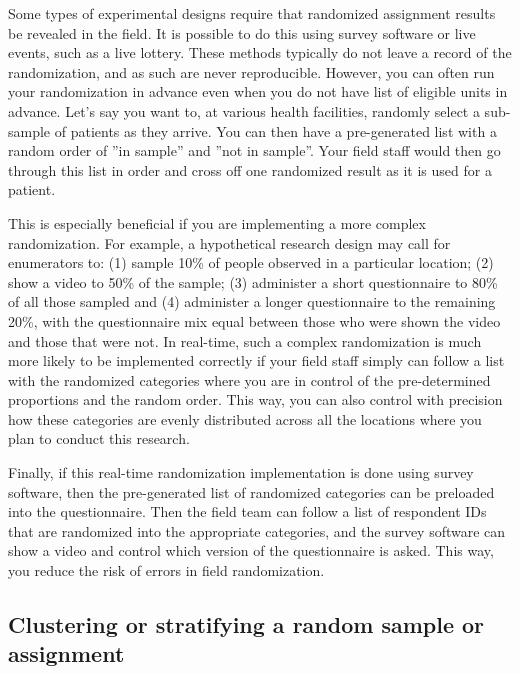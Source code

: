 
Some types of experimental designs require
that randomized assignment results be revealed in the field.
It is possible to do this using survey software or live events, such as a live lottery.
These methods typically do not leave a record of the randomization,
and as such are never reproducible.
However, you can often run your randomization in advance
even when you do not have list of eligible units in advance.
Let's say you want to, at various health facilities,
randomly select a sub-sample of patients as they arrive.
You can then have a pre-generated list
with a random order of ''in sample'' and ''not in sample''.
Your field staff would then go through this list in order
and cross off one randomized result as it is used for a patient.

This is especially beneficial if you are implementing a more complex randomization.
For example, a hypothetical research design may call for enumerators to:
(1) sample 10\% of people observed in a particular location;
(2) show a video to 50\% of the sample;
(3) administer a short questionnaire to 80\% of all those sampled
and (4) administer a longer questionnaire to the remaining 20\%,
with the questionnaire mix equal between those who were shown the video and those that were not.
In real-time, such a complex randomization is much more likely to be implemented correctly
if your field staff simply can follow a list with the randomized categories
where you are in control of the pre-determined proportions and the random order.
This way, you can also control with precision
how these categories are evenly distributed across all the locations
where you plan to conduct this research.

Finally, if this real-time randomization implementation is done using survey software,
then the pre-generated list of randomized categories can be preloaded
into the questionnaire.
Then the field team can follow a list of respondent IDs
that are randomized into the appropriate categories,
and the survey software can show a video and control which version of the questionnaire is asked.
This way, you reduce the risk of errors in field randomization.



\subsection{Clustering or stratifying a random sample or assignment}

